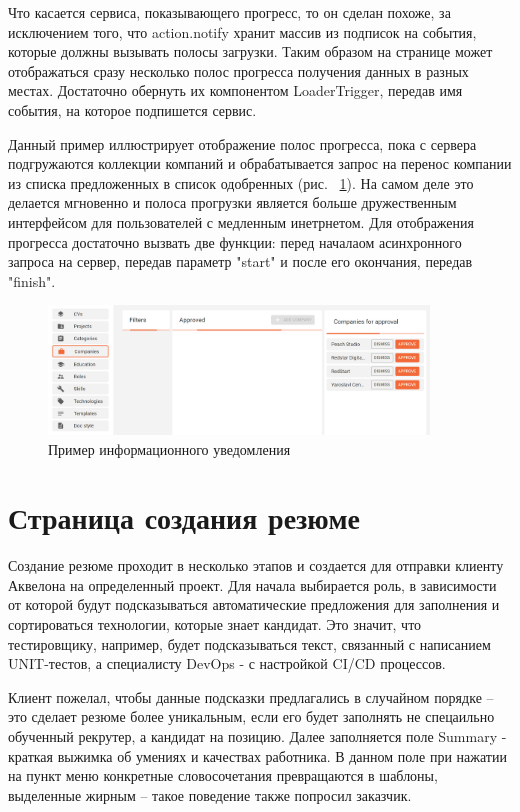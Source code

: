 \documentclass[a4paper,12pt]{diplom}
\begin{document}
Что касается сервиса, показывающего прогресс, то он сделан похоже, за исключением того, что action.notify хранит массив
из подписок на события, которые должны вызывать полосы загрузки. Таким образом на странице может отображаться сразу несколько полос прогресса получения данных в разных местах. Достаточно обернуть их 
компонентом LoaderTrigger, передав имя события, на которое подпишется сервис. 

Данный пример иллюстрирует отображение полос прогресса, пока с сервера подгружаются коллекции компаний и обрабатывается запрос на перенос компании из списка предложенных в список одобренных (рис. ~\ref{6}).
На самом деле это делается мгновенно и полоса прогрузки является больше дружественным интерфейсом для пользователей с медленным инетрнетом. Для отображения прогресса достаточно вызвать две функции: перед началаом асинхронного запроса на сервер, передав параметр "start" и после его окончания, передав "finish".

\begin{figure}[!ht]
	\centering
	\includegraphics[width=0.9\textwidth]{resources/progress.png}
	\caption{Пример информационного уведомления}
	\label{6}
\end{figure}

\section{Страница создания резюме}
Создание резюме проходит в несколько этапов и создается для отправки клиенту Аквелона на определенный проект.
Для начала выбирается роль, в зависимости от которой будут подсказываться автоматические предложения для заполнения и сортироваться технологии, которые знает кандидат. Это значит, что тестировщику, например, будет подсказываться текст, 
связанный с написанием UNIT-тестов, а специалисту DevOps - с настройкой CI/CD процессов.

Клиент пожелал, чтобы данные подсказки предлагались в случайном порядке -- это сделает резюме более уникальным, если его будет заполнять не спецаильно обученный рекрутер, а кандидат на позицию.
Далее заполняется поле Summary - краткая выжимка об умениях и качествах работника. В данном поле при нажатии на пункт меню конкретные словосочетания превращаются в шаблоны, выделенные жирным -- такое поведение также попросил заказчик.
\end{document}
